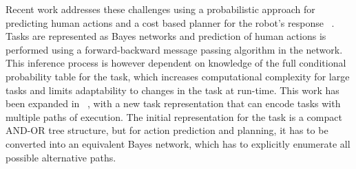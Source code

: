 \documentclass[conference]{article}
\begin{document}
Recent work  addresses these challenges using a probabilistic approach for predicting human actions and a cost based planner for the robot’s response ~\cite{hawkins2014}. Tasks are represented as Bayes networks and prediction of human actions is performed using a forward-backward message passing algorithm in the network. This inference process is however dependent on knowledge of the full conditional probability table for the task, which increases computational complexity for large tasks and limits adaptability to changes in the task at run-time. This work has been expanded in ~\cite{hawkins}, with a new task representation that can encode tasks with multiple paths of execution. The initial representation for the task is a compact AND-OR tree structure, but for action prediction and planning, it has to be converted into an equivalent Bayes network, which has to explicitly enumerate all possible alternative paths. 

% 
\end{document}
